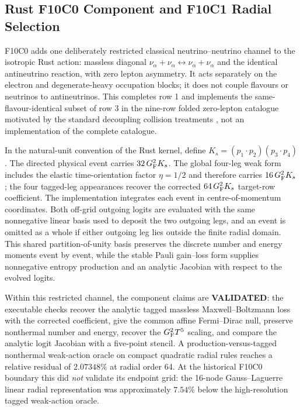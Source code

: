 \subsection{Rust F10C0 Component and F10C1 Radial Selection}

F10C0 adds one deliberately restricted classical neutrino--neutrino channel
to the isotropic Rust action: massless diagonal
$\nu_\alpha+\nu_\alpha\leftrightarrow\nu_\alpha+\nu_\alpha$ and the identical
antineutrino reaction, with zero lepton asymmetry.  It acts separately on the
electron and degenerate-heavy occupation blocks; it does not couple flavours
or neutrinos to antineutrinos.  This completes row 1 and implements the
same-flavour-identical subset of row 3 in the nine-row folded zero-lepton
catalogue motivated by the standard
decoupling collision treatments
\cite{HannestadMadsen1995,Dolgov1997,Froustey2020}, not an implementation of
the complete catalogue.

In the natural-unit convention of the Rust kernel, define
$K_s=(p_1\!\cdot p_2)(p_3\!\cdot p_4)$.  The directed physical event carries
$32\,G_{\rm F}^2K_s$.  The global four-leg weak form includes the elastic
time-orientation factor $\eta=1/2$ and therefore carries
$16\,G_{\rm F}^2K_s$; the four tagged-leg appearances recover the corrected
$64\,G_{\rm F}^2K_s$ target-row coefficient.  The implementation integrates each
event in centre-of-momentum coordinates.  Both off-grid outgoing logits are
evaluated with the same nonnegative linear basis used to deposit the two
outgoing legs, and an event is omitted as a whole if either outgoing leg lies
outside the finite radial domain.  This shared partition-of-unity basis
preserves the discrete number and energy moments event by event, while the
stable Pauli gain--loss form supplies nonnegative entropy production and an
analytic Jacobian with respect to the evolved logits.

Within this restricted channel, the component claims are
\textbf{VALIDATED}: the executable checks recover the analytic tagged
massless Maxwell--Boltzmann loss with the corrected coefficient, give the
common affine Fermi--Dirac null, preserve nonthermal number and energy, recover
the $G_{\rm F}^2T^5$ scaling, and compare the analytic logit Jacobian with a
five-point stencil.  A production-versus-tagged nonthermal weak-action oracle
on compact quadratic radial rules reaches a relative residual of
$2.07348\%$ at radial order 64.  At the historical F10C0 boundary this did
\emph{not} validate its endpoint grid: the 16-node Gauss--Laguerre linear
radial representation was approximately $7.54\%$ below the high-resolution
tagged weak-action oracle.

